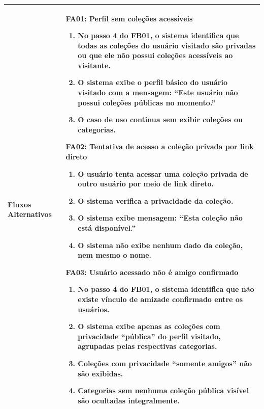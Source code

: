 \begin{longtable}{ >{\raggedright}p{2.8cm} | >{\raggedright\arraybackslash}p{10.7cm} }
Fluxos Alternativos & \mbox{}
\textbf{FA01:} Perfil sem coleções acessíveis
\vspace{2pt}
\begin{enumerate}[nosep,leftmargin=1.2em,topsep=0pt,partopsep=0pt,parsep=0pt,itemsep=0pt,after=\vspace{2pt}]
    \item No passo 4 do FB01, o sistema identifica que todas as coleções do usuário visitado são privadas ou que ele não possui coleções acessíveis ao visitante.
    \item O sistema exibe o perfil básico do usuário visitado com a mensagem: ``Este usuário não possui coleções públicas no momento.''
    \item O caso de uso continua sem exibir coleções ou categorias.
\end{enumerate}

\textbf{FA02:} Tentativa de acesso a coleção privada por link direto
\vspace{2pt}
\begin{enumerate}[nosep,leftmargin=1.2em,topsep=0pt,partopsep=0pt,parsep=0pt,itemsep=0pt,after=\vspace{2pt}]
    \item O usuário tenta acessar uma coleção privada de outro usuário por meio de link direto.
    \item O sistema verifica a privacidade da coleção.
    \item O sistema exibe mensagem: ``Esta coleção não está disponível.''
    \item O sistema não exibe nenhum dado da coleção, nem mesmo o nome.
\end{enumerate}

\textbf{FA03:} Usuário acessado não é amigo confirmado
\vspace{2pt}
\begin{enumerate}[nosep,leftmargin=1.2em,topsep=0pt,partopsep=0pt,parsep=0pt,itemsep=0pt,after=\vspace{2pt}]
    \item No passo 4 do FB01, o sistema identifica que não existe vínculo de amizade confirmado entre os usuários.
    \item O sistema exibe apenas as coleções com privacidade ``pública'' do perfil visitado, agrupadas pelas respectivas categorias.
    \item Coleções com privacidade ``somente amigos'' não são exibidas.
    \item Categorias sem nenhuma coleção pública visível são ocultadas integralmente.
\end{enumerate}
\mbox{} \\ \hline


\end{longtable}

